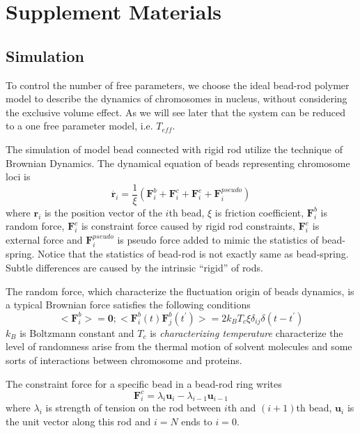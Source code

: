 \documentclass{article}
\begin{document}
\section{Supplement Materials}


\subsection{Simulation}
\label{sub:simulation}
To control the number of free parameters, we choose the ideal bead-rod polymer model to describe the dynamics of chromosomes in nucleus, without considering the exclusive volume effect. 
As we will see later that the system can be reduced to a one free parameter model, i.e. $T_{eff}$.  

The simulation of model bead connected with rigid rod utilize the technique of Brownian Dynamics\cite{Cruz2012}.
The dynamical equation of beads representing chromosome loci is
\begin{equation}
	\label{eq:differential}
	\dot{\mathbf{r}_i} = \frac{1}{\xi}(\mathbf{F}_i^b + \mathbf{F}_i^c + \mathbf{F}_i^e + \mathbf{F}_i^{pseudo}) 
\end{equation}
where $\mathbf{r}_i$ is the position vector of the $i$th bead, $\xi$ is friction coefficient, $\mathbf{F}_i^b$ is random force, $\mathbf{F}_i^c$ is constraint force caused by rigid rod constraints, $\mathbf{F}_i^e$ is external force and $\mathbf{F}_i^{pseudo}$ is pseudo force added to mimic the statistics of bead-spring. 
Notice that the statistics of bead-rod is not exactly same as bead-spring. Subtle differences are caused by the intrinsic ``rigid'' of rods\cite{Hinch1994,Cruz2012}.

The random force, which characterize the fluctuation origin of beads dynamics, is a typical Brownian force satisfies the following conditions
\begin{equation}
	<\mathbf{F}_i^b> = \mathbf{0}; <\mathbf{F}_i^b(t)\mathbf{F}_j^b(t^{\prime})> = 2k_B T_{c} \xi \delta_{ij} \delta(t-t^{\prime})
\end{equation}
$k_B$ is Boltzmann constant and $T_{c}$ is \emph{characterizing temperature} characterize the level of randomness arise from the thermal motion of solvent molecules and some sorts of interactions between chromosome and proteins.

The constraint force for a specific bead in a bead-rod ring writes
\begin{equation}
	\mathbf{F}_i^c = \lambda_i \mathbf{u}_i - \lambda_{i-1} \mathbf{u}_{i-1}
\end{equation}
where $\lambda_i$ is strength of tension on the rod between $i$th and $(i+1)$th bead, $\mathbf{u}_i$ is the unit vector along this rod and $i=N$ ends to $i=0$.
\end{document}
